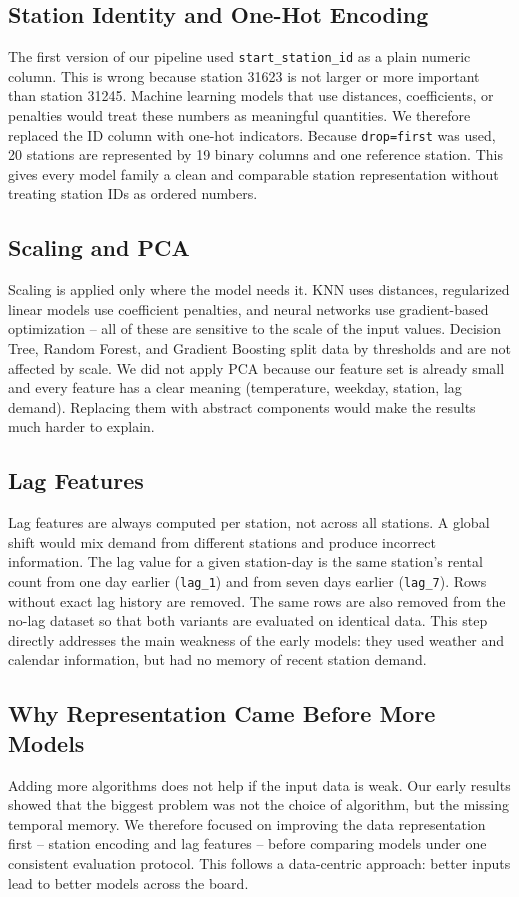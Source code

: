 \subsection{Station Identity and One-Hot Encoding}

The first version of our pipeline used \texttt{start\_station\_id} 
as a plain numeric column. This is wrong because station 31623 is not 
larger or more important than station 31245. Machine learning models 
that use distances, coefficients, or penalties would treat these numbers 
as meaningful quantities. We therefore replaced the ID column with one-hot indicators. Because \texttt{drop=first} was used, 20 stations are represented by 19 binary columns and one reference station. This gives every model family a clean and comparable station representation without treating station IDs as ordered numbers.

\subsection{Scaling and PCA}

Scaling is applied only where the model needs it. KNN uses distances, 
regularized linear models use coefficient penalties, and neural networks 
use gradient-based optimization -- all of these are sensitive to the 
scale of the input values. Decision Tree, Random Forest, and Gradient 
Boosting split data by thresholds and are not affected by scale. We 
did not apply PCA because our feature set is already small and every 
feature has a clear meaning (temperature, weekday, station, lag demand). 
Replacing them with abstract components would make the results much 
harder to explain.

\subsection{Lag Features}

Lag features are always computed per station, not across all stations. 
A global shift would mix demand from different stations and produce 
incorrect information. The lag value for a given station-day is the 
same station's rental count from one day earlier (\texttt{lag\_1}) and 
from seven days earlier (\texttt{lag\_7}). Rows without exact lag 
history are removed. The same rows are also removed from the no-lag 
dataset so that both variants are evaluated on identical data. This 
step directly addresses the main weakness of the early models: they 
used weather and calendar information, but had no memory of recent 
station demand.

\subsection{Why Representation Came Before More Models}

Adding more algorithms does not help if the input data is weak. Our 
early results showed that the biggest problem was not the choice of 
algorithm, but the missing temporal memory. We therefore focused on 
improving the data representation first -- station encoding and lag 
features -- before comparing models under one consistent evaluation 
protocol. This follows a data-centric approach: better inputs lead to 
better models across the board.